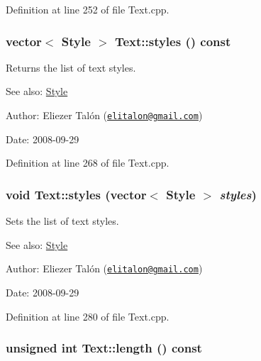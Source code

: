 Definition at line 252 of file Text.cpp.\hypertarget{class_text_a66bfa36621592ccbeda7968637d7301}{
\subsubsection[styles]{\setlength{\rightskip}{0pt plus 5cm}vector$<$ {\bf Style} $>$ Text::styles () const}}
\label{class_text_a66bfa36621592ccbeda7968637d7301}


Returns the list of text styles. 

\begin{Desc}
\item[See also:]\hyperlink{class_style}{Style}\end{Desc}
\begin{Desc}
\item[Author:]Eliezer Talón (\href{mailto:elitalon@gmail.com}{\tt elitalon@gmail.com}) \end{Desc}
\begin{Desc}
\item[Date:]2008-09-29 \end{Desc}


Definition at line 268 of file Text.cpp.\hypertarget{class_text_5782b92326b7e3c851c38f82cb412b70}{
\subsubsection[styles]{\setlength{\rightskip}{0pt plus 5cm}void Text::styles (vector$<$ {\bf Style} $>$ {\em styles})}}
\label{class_text_5782b92326b7e3c851c38f82cb412b70}


Sets the list of text styles. 

\begin{Desc}
\item[See also:]\hyperlink{class_style}{Style}\end{Desc}
\begin{Desc}
\item[Author:]Eliezer Talón (\href{mailto:elitalon@gmail.com}{\tt elitalon@gmail.com}) \end{Desc}
\begin{Desc}
\item[Date:]2008-09-29 \end{Desc}


Definition at line 280 of file Text.cpp.\hypertarget{class_text_8d76db538f8617fb8880ba3e4ff3e6a5}{
\subsubsection[length]{\setlength{\rightskip}{0pt plus 5cm}unsigned int Text::length () const}}
\label{class_text_8d76db538f8617fb8880ba3e4ff3e6a5}


